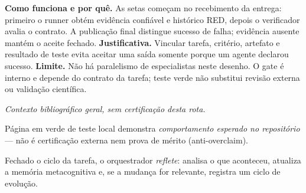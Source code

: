 \begin{descricao}
\textbf{Como funciona e por quê.} As setas começam no recebimento da entrega: primeiro o runner obtém evidência confiável e histórico RED, depois o verificador avalia o contrato. A publicação final distingue sucesso de falha; evidência ausente mantém o aceite fechado.
\textbf{Justificativa.} Vincular tarefa, critério, artefato e resultado de teste evita aceitar uma saída somente porque um agente declarou sucesso.
\textbf{Limite.} Não há paralelismo de especialistas neste desenho. O gate é interno e depende do contrato da tarefa; teste verde não substitui revisão externa ou validação científica.
\end{descricao}


\noindent\textit{Contexto bibliográfico geral, sem certificação desta rota.} 


\begin{aviso}
Página em verde de teste local demonstra \emph{comportamento esperado no
repositório} — não é certificação externa nem prova de mérito (anti-overclaim).
\end{aviso}


\begin{descricao}
Fechado o ciclo da tarefa, o orquestrador \emph{reflete}: analisa o que aconteceu,
atualiza a memória metacognitiva e, se a mudança for relevante, registra um ciclo
de evolução.
\end{descricao}

